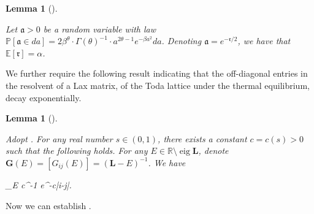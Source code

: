 \documentclass{amsart}
\numberwithin{equation}{section}
\DeclareMathOperator{\eig}{eig}
\newtheorem{lem}[thm]{Lemma}
\theoremstyle{remark}
\theoremstyle{definition}
\begin{document}
	
	\begin{lem}[{\cite[Lemma 3.11]{LC}}]
		
		\label{aintegral} 
		
		Let $\mathfrak{a} > 0$ be a random variable with law $\mathbb{P} [\mathfrak{a} \in da] = 2 \beta^{\theta} \cdot \Gamma(\theta)^{-1} \cdot a^{2\theta-1} e^{-\beta a^2} da$. Denoting $\mathfrak{a} = e^{-\mathfrak{r}/2}$, we have that $\mathbb{E} [\mathfrak{r}] = \alpha$.
	\end{lem} 
	
	
	We further require the following result indicating that the off-diagonal entries in the resolvent of a Lax matrix, of the Toda lattice under the thermal equilibrium, decay exponentially. 
	
	\begin{lem}[{\cite[Theorem 4]{LRBM}}]
		
		\label{gijexponential}
		
		Adopt . For any real number $s \in (0, 1)$, there exists a constant $c = c(s) > 0$ such that the following holds. For any $E \in \mathbb{R} \setminus \eig \bm{L}$, denote $\bm{G} (E) = [G_{ij} (E) ] = (\bm{L} - E)^{-1}$. We have  
		\begin{flalign}
			\label{gijs}
			\displaystyle\sup_{E \in {}}  \big[ |G_{ij} (E) |^s \big] \le c^{-1} e^{-c|i-j|}.
		\end{flalign}  
	\end{lem}
	
	
	Now we can establish .
	
\end{document}
